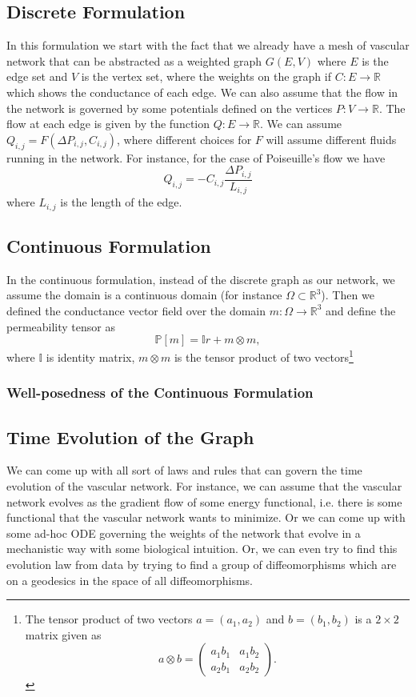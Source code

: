 \documentclass[10pt,a4paper,twocolumn]{article}
\newcommand{\R}{\mathbb{R}}
\begin{document}
	\subsection{Discrete Formulation}
	In this formulation we start with the fact that we already have a mesh of vascular network that can be abstracted as a weighted graph $ G(E,V) $ where $ E $ is the edge set and $ V $ is the vertex set, where the weights on the graph if $ C: E \to \R $ which shows the conductance of each edge. We can also assume that the flow in the network is governed by some potentials defined on the vertices $ P: V \to \R $. The flow at each edge is given by the function $ Q: E \to \R $. We can assume $ Q_{i,j} = F(\Delta P_{i,j},C_{i,j}) $, where different choices for $ F $ will assume different fluids running in the network. For instance, for the case of Poiseuille's flow we have
	\[ Q_{i,j} = -C_{i,j} \frac{\Delta P_{i,j}}{L_{i,j}} \]
	where $ L_{i,j} $ is the length of the edge.
	
	\subsection{Continuous Formulation}
	In the continuous formulation, instead of the discrete graph as our network, we assume the domain is a continuous domain (for instance $ \Omega \subset \R^3 $). Then we defined the conductance vector field over the domain $ m: \Omega \to \R^3 $ and define the permeability tensor as
	\[ \mathbb{P}[m] = \mathbb{I}r + m\otimes m, \]
	where $ \mathbb{I} $ is identity matrix, $ m\otimes m $ is the tensor product of two vectors\footnote{The tensor product of two vectors $ a=(a_1,a_2) $ and $ b = (b_1,b_2) $ is a $ 2\times 2 $ matrix given as 
	\[ a\otimes b = 
	\begin{pmatrix}
		a_1 b_1 & a_1 b_2 \\
		a_2 b_1 & a_2 b_2
	\end{pmatrix}.
	 \]
	}
	
	\subsubsection{Well-posedness of the Continuous Formulation}
	
	
	\subsection{Time Evolution of the Graph}
	We can come up with all sort of laws and rules that can govern the time evolution of the vascular network. For instance, we can assume that the vascular network evolves as the gradient flow of some energy functional, i.e. there is some functional that the vascular network wants to minimize. Or we can come up with some ad-hoc ODE governing the weights of the network that evolve in a mechanistic way with some biological intuition. Or, we can even try to find this evolution law from data by trying to find a group of diffeomorphisms which are on a geodesics in the space of all diffeomorphisms. 
	
\end{document}
